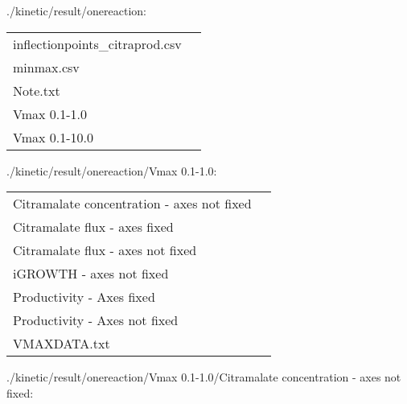 \documentclass[a4paper, parskip=full]{scrreprt}
\begin{document}
./kinetic/result/onereaction:

\begin{longtable}{ll}
inflectionpoints\_citraprod.csv\\
minmax.csv\\
Note.txt\\
Vmax 0.1-1.0\\
Vmax 0.1-10.0\\
\end{longtable}

./kinetic/result/onereaction/Vmax 0.1-1.0:

\begin{longtable}{ll}
Citramalate concentration - axes not fixed\\
Citramalate flux - axes fixed\\
Citramalate flux - axes not fixed\\
iGROWTH - axes not fixed\\
Productivity - Axes fixed\\
Productivity - Axes not fixed\\
VMAXDATA.txt\\
\end{longtable}

./kinetic/result/onereaction/Vmax 0.1-1.0/Citramalate concentration - axes not fixed:
\end{document}
